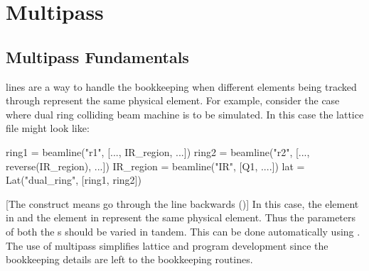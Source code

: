 \chapter{Multipass}
\label{c:multipass}

\section{Multipass Fundamentals}
\label{s:multipass.fund}

 lines are a way to handle the bookkeeping when different elements being tracked
through represent the same physical element. For example, consider the case where dual ring colliding
beam machine is to be simulated. In this case the lattice file might look like:
\begin{example}
  ring1 = beamline("r1", [..., IR_region, ...])
  ring2 = beamline("r2", [..., reverse(IR_region), ...])
  IR_region = beamline("IR", [Q1, ....])
  lat = Lat("dual_ring", [ring1, ring2])
\end{example}
[The  construct means go through the line backwards ()] 
In this case, the  element in  and the
 element in  represent the same physical element.
Thus the parameters
of both the s should be varied in tandem. This can be done automatically using .
The use of multipass simplifies lattice and program development since the bookkeeping details are left
to the \accellat bookkeeping routines.

